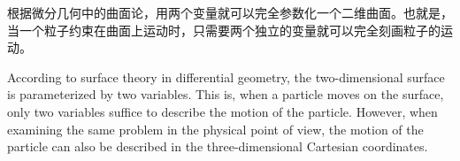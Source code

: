 \begin{cabstract}
    根据微分几何中的曲面论，用两个变量就可以完全参数化一个二维曲面。也就是，当一个粒子约束在曲面上运动时，只需要两个独立的变量就可以完全刻画粒子的运动。
\end{cabstract}

\begin{eabstract}
    According to surface theory in differential geometry, the two-dimensional surface is parameterized by two variables. This is, when a particle moves on the surface, only two variables suffice to describe the motion of the particle. However, when examining the same problem in the physical point of view, the motion of the particle can also be described in the three-dimensional Cartesian coordinates.
\end{eabstract}
